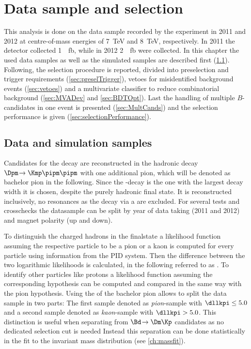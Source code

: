 \chapter{Data sample and selection}

This analysis is done on the data sample recorded by the \lhcb experiment in \num{2011} and \num{2012} at centre-of-mass energies of \SI{7}{\tera\electronvolt} and \SI{8}{\tera\electronvolt}, respectively.
In \num{2011} the detector collected \SI{1}{\per\femto\barn}, while in \num{2012} \SI{2}{\per\femto\barn} were collected.
In this chapter the used data samples as well as the simulated samples are described first (\cref{sec:Samples}).
Following, the selection procedure is reported, divided into preselection and trigger requirements (\cref{sec:preselTrigger}), vetoes for \eg misidentified background events (\cref{sec:vetoes}) and a multivariate classifier to reduce combinatorial background (\cref{sec:MVADev} and \cref{sec:BDTOpt}).
Last the handling of multiple $B$-candidates in one event is presented (\cref{sec:MultCands}) and the selection performance is given (\cref{sec:selectionPerformance}).

\section{Data and simulation samples}
\label{sec:Samples}

Candidates for the decay \BdToDpi are reconstructed in the hadronic decay $\Dpm\!\to\Kmp\pipm\pipm$ with one additional pion, which will be denoted as bachelor pion in the following.
Since the \D-decay is the one with the largest decay width it is chosen, despite the purely hadronic final state.
It is reconstructed inclusively, \ie no resonances as the decay via a \Kstarz are excluded.
For several tests and crosschecks the datasample can be split by year of data taking (\num{2011} and \num{2012}) and magnet polarity (up and down).

To distinguish the charged hadrons in the finalstate a likelihood function assuming the respective particle to be a pion or a kaon is computed for every particle using information from the PID system.
Then the difference between the two logarithmic likelihoods is calculated, in the following referred to as \dllkpi.
To identify other particles like protons a likelihood function assuming the corresponding hypothesis can be computed and compared in the same way with the pion hypothesis.
Using the \dllkpi of the bachelor pion allows to split the data sample in two parts: The first sample denoted as \emph{pion}-sample with $\dllkpi\leq5.0$ and a second sample denoted as \emph{kaon}-sample with $\dllkpi>5.0$. This distinction is useful when separating \BdToDpi from $\Bd\!\to\Dm\Kp$ candidates as no dedicated selection cut is needed
Instead this separation can be done statistically in the fit to the invariant mass distribution (see \cref{ch:massfit}).

